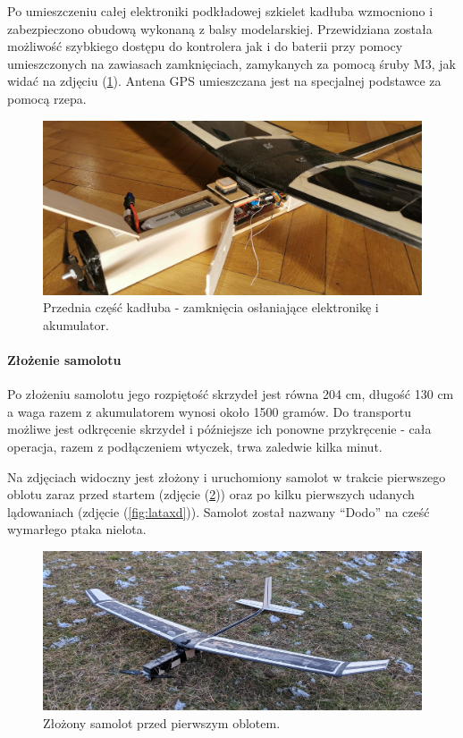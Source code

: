 \documentclass[12pt, a4paper]{article}
\let\oldref\ref
\renewcommand{\ref}[1]{(\oldref{#1})}
\begin{document}
Po umieszczeniu całej elektroniki podkładowej szkielet kadłuba wzmocniono i zabezpieczono obudową wykonaną z balsy modelarskiej. Przewidziana została możliwość szybkiego dostępu do kontrolera jak i do baterii przy pomocy umieszczonych na zawiasach zamknięciach, zamykanych za pomocą śruby M3, jak widać na zdjęciu \ref{fig:przod}. Antena GPS umieszczana jest na specjalnej podstawce za pomocą rzepa.

\begin{figure}[ht]
    \centering
    \includegraphics[width=1\textwidth]{przod}
    \caption{Przednia część kadłuba - zamknięcia osłaniające elektronikę i akumulator.}
    \label{fig:przod}
\end{figure}

\FloatBarrier
\paragraph{Złożenie samolotu}\mbox{}

Po złożeniu samolotu jego rozpiętość skrzydeł jest równa 204 cm, długość 130 cm a waga razem z akumulatorem wynosi około 1500 gramów. Do transportu możliwe jest odkręcenie skrzydeł i późniejsze ich ponowne przykręcenie - cała operacja, razem z podłączeniem wtyczek, trwa zaledwie kilka minut. 

Na zdjęciach widoczny jest złożony i uruchomiony samolot w trakcie pierwszego oblotu zaraz przed startem (zdjęcie \ref{fig:gotowy}) oraz po kilku pierwszych udanych lądowaniach (zdjęcie \ref{fig:lataxd}). Samolot został nazwany ``Dodo'' na cześć wymarłego ptaka nielota. 

\begin{figure}[ht]
    \centering
    \includegraphics[width=1\textwidth]{dolotu}
    \caption{Złożony samolot przed pierwszym oblotem.}
    \label{fig:gotowy}
\end{figure}
\end{document}

